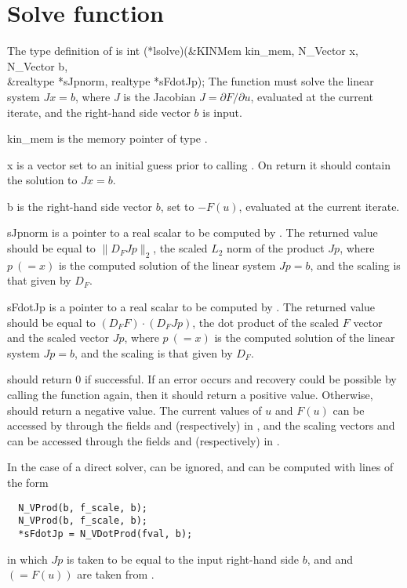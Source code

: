 \section{Solve function}
The type definition of  is
{
  int (*lsolve)(&KINMem kin\_mem, N\_Vector x, N\_Vector b, \\
                &realtype *sJpnorm, realtype *sFdotJp);
}
{
  The  function must solve the linear system $J x = b$, where $J$ is
  the Jacobian $J = \partial F / \partial u$, evaluated at the current iterate,
  and the right-hand side vector $b$ is input. 
}
{
  \begin{args}[N\_Vector]
  \item[kin\_mem]
    is the {\kinsol} memory pointer of type .
  \item[x]
    is a vector set to an initial guess prior to calling . 
    On return it should contain the solution to $J x = b$.
  \item[b]
    is the right-hand side vector $b$, set to $-F(u)$, evaluated at
    the current iterate.
  \item[sJpnorm]
    is a pointer to a real scalar to be computed by .  The returned
    value  should be equal to $\|D_F Jp\|_2$, the scaled $L_2$
    norm of the product $Jp$, where $p~(= x)$ is the computed solution of the
    linear system $J p = b$, and the scaling is that given by $D_F$.
  \item[sFdotJp]
    is a pointer to a real scalar to be computed by .  The returned
    value   should be equal to $(D_F F)\cdot(D_F Jp)$, the
    dot product of the scaled $F$ vector and the scaled vector $J p$, where
    $p~(= x)$ is the computed solution of the linear system $J p = b$,
    and the scaling is that given by $D_F$.
  \end{args}
}
{
   should return $0$ if successful.
  If an error occurs and recovery could be possible by calling the
   function again, then it should return a positive value.
  Otherwise,  should return a negative value.
}
{
  The current values of $u$ and $F(u)$ can be accessed by  through
  the fields  and  (respectively) in ,
  and the scaling vectors  and  can be accessed
  through the fields  and  (respectively)
   in .
}

In the case of a direct solver,  can be ignored, and
 can be computed with lines of the form
\vspace{-.1in}
  \begin{verbatim}
  N_VProd(b, f_scale, b);
  N_VProd(b, f_scale, b);
  *sFdotJp = N_VDotProd(fval, b);
  \end{verbatim}
\vspace{-.2in}
in which $Jp$ is taken to be equal to the input right-hand side $b$,
and  and  $(= F(u))$ are taken from .

